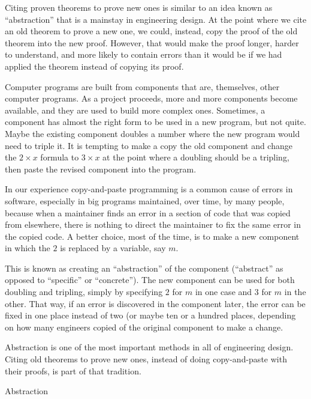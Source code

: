 \begin{aside}
Citing proven theorems to prove new ones
is similar to an idea known as ``abstraction''
that is a mainstay in engineering design.
At the point where we cite an old theorem to prove a new one,
we could, instead, copy the proof of the old theorem into the new proof.
However, that would make the proof longer, harder to understand,
and more likely to contain errors than it would be if we had
applied the theorem instead of copying its proof.

Computer programs are built from components that are, themselves,
other computer programs. As a project proceeds, more and more
components become available, and they are used to build more complex ones.
Sometimes, a component has almost the right form to be used in a new program,
but not quite.
Maybe the existing component doubles a number where the new program would need
to triple it. It is tempting to make a copy the
old component and change the $2 \times x$ formula to $3 \times x$
at the point where a doubling should be a tripling,
then paste the revised component into the program.

In our experience
copy-and-paste programming is
a common cause of errors in software,
especially in big programs maintained,
over time, by many people, because
when a maintainer finds an error in
a section of code that was copied from elsewhere,
there is nothing to direct the maintainer to fix
the same error in the copied code.
A better choice, most of the time,
is to make a new component
in which the $2$ is replaced by a variable,
say $m$.

This is known as creating an ``abstraction'' of the component
(``abstract'' as opposed to ``specific'' or ``concrete'').
The new component can be used for both doubling and tripling,
simply by specifying $2$ for $m$ in one case and $3$ for $m$ in the other.
That way, if an error is discovered in the component later,
the error can be fixed in one place instead of two
(or maybe ten or a hundred places, depending on how many engineers
copied of the original component to make a change.

Abstraction is one of the most important methods in
all of engineering design. Citing old theorems to prove new ones,
instead of doing copy-and-paste with their proofs,
is part of that tradition.
\caption{Abstraction}
\label{abstraction}
\end{aside}

